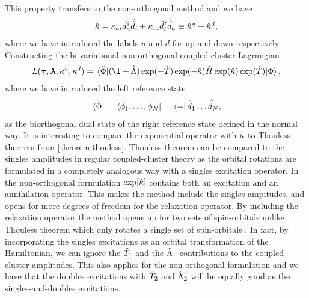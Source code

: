             This property transfers to the non-orthogonal method and we have
            \begin{align}
                \hat{\kappa}
                = \kappa_{ai} \hat{d}^{\dagger}_{a}\hat{\tilde{d}}_{i}
                + \kappa_{ia} \hat{d}^{\dagger}_{i}\hat{\tilde{d}}_{a}
                \equiv
                \hat{\kappa}^{u} + \hat{\kappa}^{d},
            \end{align}
            where we have introduced the labels $u$ and $d$ for up and down
            respectively \cite{rolf-nocc}.
            Constructing the bi-variational non-orthogonal coupled-cluster
            Lagrangian
            \begin{align}
                L(\vfg{\clustamp}, \vfg{\clustlamp}, \noccten^{u},
                \noccten^{d})
                = \mel*{\tilde{\slat}}{
                    (\1 + \clustl)
                    \exponential(-\clust)
                    \exponential(-\nocc)
                    \hamil
                    \exponential(\nocc)
                    \exponential(\clust)
                }{\slat},
                \label{eq:nocc-lagrangian}
            \end{align}
            where we have introduced the left reference state
            \begin{align}
                \bra*{\tilde{\Phi}}
                = \bra*{\tilde{\phi}_1, \dots, \tilde{\phi}_N}
                = \bra*{-}\hat{\tilde{d}}_{1}\dots\hat{\tilde{d}}_{N},
            \end{align}
            as the biorthogonal dual state of the right reference state defined
            in the normal way.
            It is interesting to compare the exponential operator with $\hat{\kappa}$
            to Thouless theorem from \autoref{theorem:thouless}.
            Thouless theorem can be compared to the singles amplitudes in
            regular coupled-cluster theory as the orbital rotations are
            formulated in a completely analogous way with a singles excitation
            operator.
            In the non-orthogonal formulation $\exp[\hat{\kappa}]$ contains both an
            excitation and an annihilation operator.
            This makes the method include the singles ampitudes, and opens for
            more degrees of freedom for the relaxation operator.
            By including the relaxation operator the method opens up for two
            sets of spin-orbitals unlike Thouless theorem which only rotates a
            single set of spin-orbitals \cite{helgaker-molecular}.
            In fact, by incorporating the singles excitations as an orbital
            transformation of the Hamiltonian, we can ignore the $\hat{T}_1$ and
            the $\hat{\Lambda}_1$ contributions to the coupled-cluster amplitudes.
            This also applies for the non-orthogonal formulation and we have
            that the doubles excitations with $\hat{T}_2$ and $\hat{\Lambda}_2$ will be
            equally good as the singles-and-doubles excitations.

